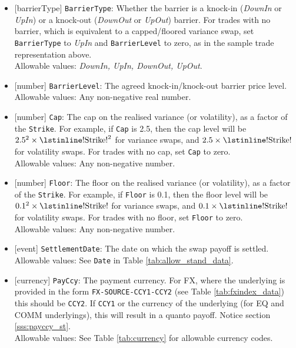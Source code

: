 \begin{itemize}
  \item{}[barrierType] \lstinline!BarrierType!: Whether the barrier is a knock-in (\emph{DownIn} or \emph{UpIn}) or a knock-out
  (\emph{DownOut} or \emph{UpOut}) barrier. For trades with no barrier, which is equivalent to a capped/floored
  variance swap, set \lstinline!BarrierType! to \emph{UpIn} and \lstinline!BarrierLevel! to zero, as in the sample trade
  representation above. \\
  Allowable values: \emph{DownIn, UpIn, DownOut, UpOut}.
  \item{}[number] \lstinline!BarrierLevel!: The agreed knock-in/knock-out barrier price level. \\
  Allowable values: Any non-negative real number.
  \item{}[number] \lstinline!Cap!: The cap on the realised variance (or volatility), as a factor of the \lstinline!Strike!. For example,
  if \lstinline!Cap! is 2.5, then the cap level will be $2.5^2 \times \text{\lstinline!Strike!}^2$ for variance swaps, and
  $2.5 \times \text{\lstinline!Strike!}$ for volatility swaps. For trades with no cap, set \lstinline!Cap! to zero. \\
  Allowable values: Any non-negative number.
  \item{}[number] \lstinline!Floor!: The floor on the realised variance (or volatility), as a factor of the \lstinline!Strike!. For example,
  if \lstinline!Floor! is 0.1, then the floor level will be $0.1^2 \times \text{\lstinline!Strike!}$ for variance swaps, and
  $0.1 \times \text{\lstinline!Strike!}$ for volatility swaps. For trades with no floor, set
  \lstinline!Floor! to zero. \\
  Allowable values: Any non-negative number.
  \item{}[event] \lstinline!SettlementDate!: The date on which the swap payoff is settled. \\
  Allowable values: See \lstinline!Date! in Table \ref{tab:allow_stand_data}.
  \item{}[currency] \lstinline!PayCcy!: The payment currency. For FX, where the underlying is provided
      in the form \lstinline!FX-SOURCE-CCY1-CCY2! (see Table \ref{tab:fxindex_data}) this should
      be \lstinline!CCY2!. If \lstinline!CCY1! or the currency of the underlying (for EQ and
      COMM underlyings), this will result in a quanto payoff. Notice section \ref{sss:payccy_st}. \\
        Allowable values: See Table \ref{tab:currency} for allowable currency codes.
\end{itemize}

